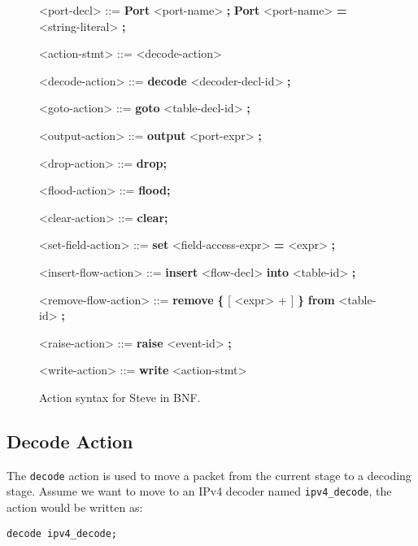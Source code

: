 \begin{figure}
\begin{mdframed}
\begin{grammar}
<port-decl> ::=
\textbf{Port} <port-name> \textbf{;}
\alt \textbf{Port} <port-name> \textbf{=} <string-literal> \textbf{;}

<action-stmt> ::=
<decode-action>

<decode-action> ::=
\textbf{decode} <decoder-decl-id> \textbf{;}

<goto-action> ::=
\textbf{goto} <table-decl-id> \textbf{;}

<output-action> ::=
\textbf{output} <port-expr> \textbf{;}

<drop-action> ::= \textbf{drop;}

<flood-action> ::= \textbf{flood;}

<clear-action> ::= \textbf{clear;}

<set-field-action> ::= \textbf{set} <field-access-expr> \textbf{=} <expr> \textbf{;}

<insert-flow-action> ::= \textbf{insert} <flow-decl> \textbf{into} <table-id> \textbf{;}

<remove-flow-action> ::= \textbf{remove} \textbf{\{} [ <expr> + ] \textbf{\}}
\textbf{from} <table-id> \textbf{;}

<raise-action> ::= \textbf{raise} <event-id> \textbf{;}

<write-action> ::= \textbf{write} <action-stmt>

\end{grammar}
\end{mdframed}
\caption{Action syntax for Steve in BNF.}
\label{fg:action_syntax}
\end{figure}

\subsection{Decode Action} \label{decode_action_tut}

The \texttt{decode} action is used to move a packet from the current stage to a decoding stage. Assume we want to move to an IPv4 decoder named \texttt{ipv4\_decode}, the action would be written as:

\begin{lstlisting}
decode ipv4_decode;
\end{lstlisting}

